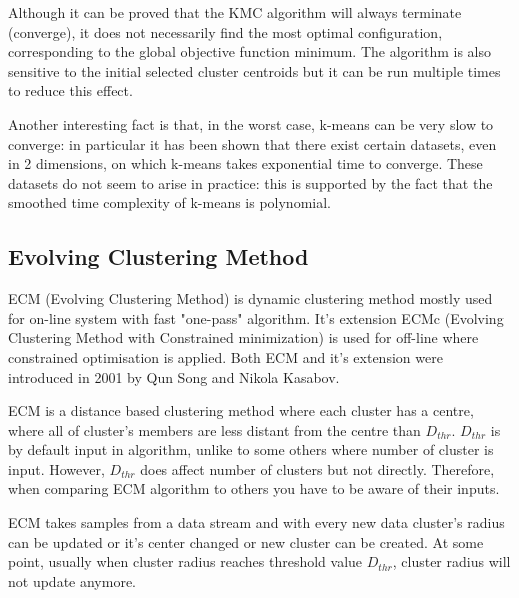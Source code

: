 \documentclass[conference]{IEEEtran}
\begin{document}
Although it can be proved that the KMC algorithm will always terminate (converge),
it does not necessarily find the most optimal configuration,
corresponding to the global objective function minimum. The algorithm is also sensitive
to the initial selected cluster centroids but it can be run multiple times to reduce this effect.

Another interesting fact is that, in the worst case, k-means can be very slow to converge:
in particular it has been shown that there exist certain datasets,
even in 2 dimensions, on which k-means takes exponential time to converge.
These datasets do not seem to arise in practice: this is supported by the
fact that the smoothed time complexity of k-means is polynomial.


\subsection{Evolving Clustering Method}

ECM (Evolving Clustering Method) is dynamic clustering method mostly used for on-line system with fast "one-pass" algorithm. It's extension ECMc (Evolving Clustering Method with Constrained minimization) is used for off-line where constrained optimisation is applied. Both ECM and it's extension were introduced in 2001 by Qun Song and Nikola Kasabov.

ECM is a distance based clustering method where each cluster has a centre, where all of cluster's members are less distant from the centre than $D_{thr}$. $D_{thr}$ is by default input in algorithm, unlike to some others where number of cluster is input. However, $D_{thr}$ does affect number of clusters but not directly. Therefore, when comparing ECM algorithm to others you have to be aware of their inputs.

ECM takes samples from a data stream and with every new data cluster's radius can be updated or it's center changed or new cluster can be created. At some point, usually when cluster radius reaches threshold value $D_{thr}$, cluster radius will not update anymore.
\end{document}
